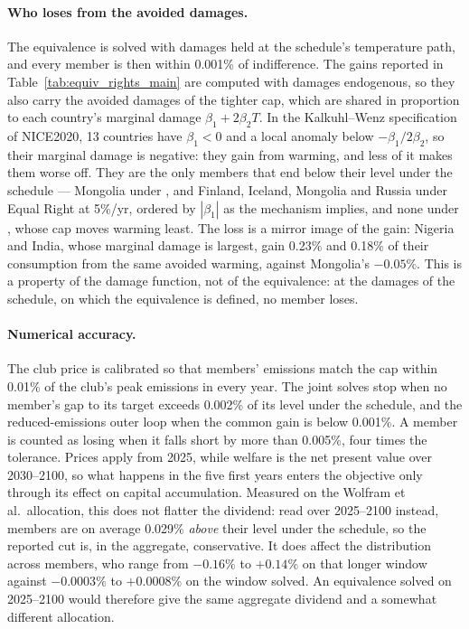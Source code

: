 \documentclass[12pt,english]{article}
\theoremstyle{remark}
\begin{document}
\paragraph{Who loses from the avoided damages.} The equivalence is solved with damages held at the schedule's temperature path, and every member is then within 0.001\% of indifference. The gains reported in Table~\ref{tab:equiv_rights_main} are computed with damages endogenous, so they also carry the avoided damages of the tighter cap, which are shared in proportion to each country's marginal damage $\beta_1+2\beta_2 T$. In the Kalkuhl--Wenz specification of NICE2020, 13 countries have $\beta_1<0$ and a local anomaly below $-\beta_1/2\beta_2$, so their marginal damage is negative: they gain from warming, and less of it makes them worse off. They are the only members that end below their level under the schedule --- Mongolia under \citet{banerjee_grand_2025}, and Finland, Iceland, Mongolia and Russia under Equal Right at 5\%/yr, ordered by $|\beta_1|$ as the mechanism implies, and none under \citet{wolfram_building_2025}, whose cap moves warming least. The loss is a mirror image of the gain: Nigeria and India, whose marginal damage is largest, gain 0.23\% and 0.18\% of their consumption from the same avoided warming, against Mongolia's $-0.05\%$. This is a property of the damage function, not of the equivalence: at the damages of the schedule, on which the equivalence is defined, no member loses.

\paragraph{Numerical accuracy.} The club price is calibrated so that members' emissions match the cap within 0.01\% of the club's peak emissions in every year. The joint solves stop when no member's gap to its target exceeds 0.002\% of its level under the schedule, and the reduced-emissions outer loop when the common gain is below 0.001\%. A member is counted as losing when it falls short by more than 0.005\%, four times the tolerance. Prices apply from 2025, while welfare is the net present value over 2030--2100, so what happens in the five first years enters the objective only through its effect on capital accumulation. Measured on the Wolfram et al.\ allocation, this does not flatter the dividend: read over 2025--2100 instead, members are on average 0.029\% \emph{above} their level under the schedule, so the reported cut is, in the aggregate, conservative. It does affect the distribution across members, who range from $-0.16\%$ to $+0.14\%$ on that longer window against $-0.0003\%$ to $+0.0008\%$ on the window solved. An equivalence solved on 2025--2100 would therefore give the same aggregate dividend and a somewhat different allocation.
\end{document}
